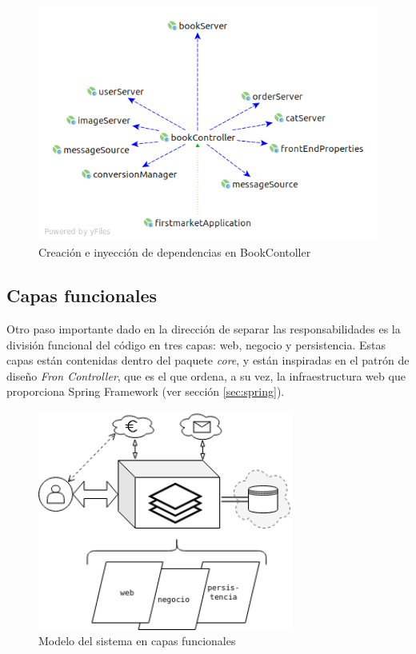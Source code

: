 \documentclass[a4paper,12pt,twoside,openright]{report}
\begin{document}
	\begin{figure}[htb!]
		\centering
		\includegraphics[width=\textwidth]{di_bookController}
		\caption{Creación e inyección de dependencias en BookContoller}
		\label{fig:di_bookController}
	\end{figure}
    
    \subsection{Capas funcionales} \label{sec:design_layer}
    Otro paso importante dado en la dirección de separar las responsabilidades es la división funcional del código en tres capas: web, negocio y persistencia. Estas capas están contenidas dentro del paquete \emph{core}, y están inspiradas en el patrón de diseño \emph{Fron Controller}, que es el que ordena, a su vez, la infraestructura web que proporciona Spring Framework (ver sección \ref{sec:spring}).
    
    \begin{figure}[htb!]
    	\centering
    	\includegraphics[width=0.75\textwidth,keepaspectratio]{desing_layer}
    	\caption{Modelo del sistema en capas funcionales}
    	\label{fig:desing_layer}
    \end{figure}
    
\end{document}
